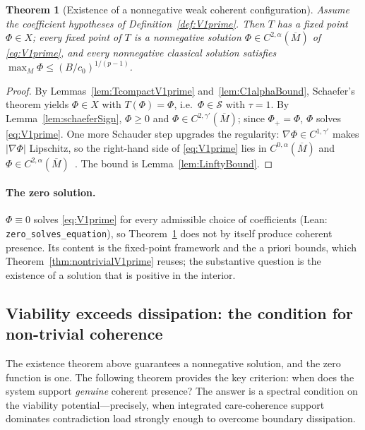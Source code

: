 \documentclass[11pt]{article}
\theoremstyle{plain}
\newtheorem{theorem}{Theorem}[section]
\theoremstyle{definition}
\theoremstyle{remark}
\begin{document}
\begin{theorem}[Existence of a nonnegative weak coherent configuration]\label{thm:existenceV1prime}
Assume the coefficient hypotheses of Definition~\ref{def:V1prime}. Then \(T\) has a fixed point \(\Phi\in X\); every fixed point of \(T\) is a nonnegative solution \(\Phi\in C^{2,\alpha}(\overline M)\) of \eqref{eq:V1prime}, and every nonnegative classical solution satisfies \(\max_M\Phi\le (B/c_0)^{1/(p-1)}\).
\end{theorem}
\begin{proof}
By Lemmas~\ref{lem:TcompactV1prime} and~\ref{lem:C1alphaBound}, Schaefer's theorem yields \(\Phi\in X\) with \(T(\Phi)=\Phi\), i.e.\ \(\Phi\in\mathcal S\) with \(\tau=1\). By Lemma~\ref{lem:schaeferSign}, \(\Phi\ge 0\) and \(\Phi\in C^{2,\gamma'}(\overline M)\); since \(\Phi_+=\Phi\), \(\Phi\) solves \eqref{eq:V1prime}. One more Schauder step upgrades the regularity: \(\nabla\Phi\in C^{1,\gamma'}\) makes \(|\nabla\Phi|\) Lipschitz, so the right-hand side of \eqref{eq:V1prime} lies in \(C^{0,\alpha}(\overline M)\) and \(\Phi\in C^{2,\alpha}(\overline M)\)~\cite[Thm.~6.14]{GilbargTrudinger2001}. The bound is Lemma~\ref{lem:LinftyBound}.
\end{proof}

\paragraph{The zero solution.}
\(\Phi\equiv 0\) solves \eqref{eq:V1prime} for every admissible choice of coefficients (Lean: \texttt{zero\_solves\_equation}), so Theorem~\ref{thm:existenceV1prime} does not by itself produce coherent presence. Its content is the fixed-point framework and the a priori bounds, which Theorem~\ref{thm:nontrivialV1prime} reuses; the substantive question is the existence of a solution that is positive in the interior.

\subsection{Viability exceeds dissipation: the condition for non-trivial coherence}\label{sec:positive}
The existence theorem above guarantees a nonnegative solution, and the zero function is one. The following theorem provides the key criterion: when does the system support \emph{genuine} coherent presence? The answer is a spectral condition on the viability potential---precisely, when integrated care-coherence support dominates contradiction load strongly enough to overcome boundary dissipation.
\end{document}
